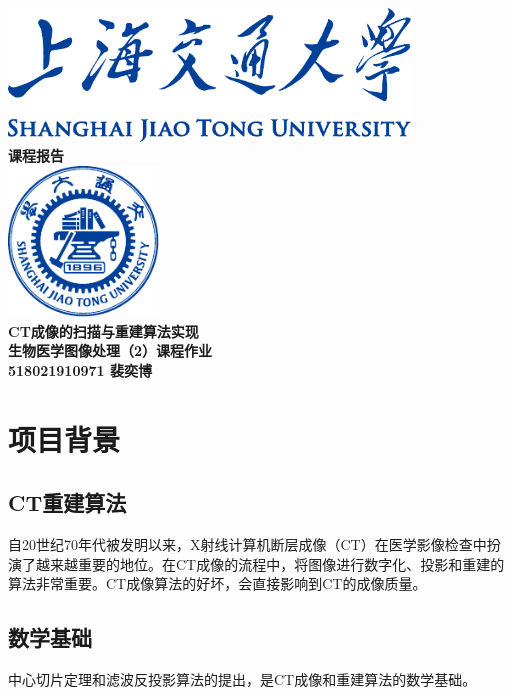 \documentclass[UTF8]{ctexart}
\begin{document}
\begin{titlepage}
    \begin{center}
        \includegraphics[width=0.8\textwidth]{sjtu-name-blue.pdf}\\[1cm]
        \textsc{\Huge \bfseries 课程报告}\\[1.5cm]
        \includegraphics[width=0.3\textwidth]{sjtu-badge-blue.pdf}\\[0.5cm]    

        \Huge \bfseries{CT成像的扫描与重建算法实现}\\[1cm]
        \LARGE \bfseries{生物医学图像处理（2）课程作业}\\[1cm]
        \Large \bfseries{518021910971 裴奕博}
    \end{center}
\end{titlepage}
\tableofcontents
\newpage

\section{项目背景}

\subsection{CT重建算法}
自20世纪70年代被发明以来，X射线计算机断层成像（CT）在医学影像检查中扮演了越来越重要的地位。在CT成像的流程中，将图像进行数字化、投影和重建的算法非常重要。CT成像算法的好坏，会直接影响到CT的成像质量。

\subsection{数学基础}
中心切片定理和滤波反投影算法的提出，是CT成像和重建算法的数学基础。
\end{document}

